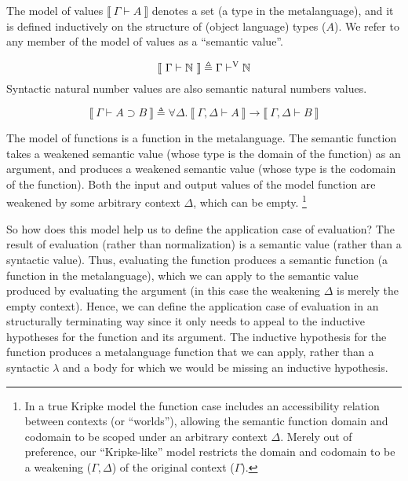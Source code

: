 \documentclass[runningheads,a4paper]{llncs}
\newenvironment{mydefinition}[3]
{ \begin{mydefinition'}[#1] \label{def:#2}
  \hfill\break
  #3
}
{ \end{mydefinition'} }
\def\dfn{\triangleq}
\def\arr{\supset}
\def\marr{\rightarrow}
\def\nat{\mathbb{N}}
\newcommand{\turn}[1]{\vdash^\con{#1}}
\newcommand{\all}[1]{\forall#1.~}
\newcommand{\els}[1]{\llbracket ~ #1 ~ \rrbracket}
\newcommand{\con}[1]{\textmd{#1}}
\newcommand{\typm}[1]{\els{\Gamma \vdash #1}}
\newcommand{\gdtypm}[1]{\els{\Gamma, \Delta \vdash #1}}
\newcommand{\typv}[1]{\Gamma \turn{V} #1}
\begin{document}
\begin{mydefinition}{Semantic Values}{mval}
{
The model of values $\typm{A}$ denotes a set (a type in the
metalanguage), and it is defined inductively on the structure
of (object language) types ($A$). We refer to any member of the model
of values as a ``semantic value''.
}

\begin{mycase}
$$
\typm{\nat} \dfn \typv{\nat}
$$
Syntactic natural number values are also semantic natural numbers
values.
\end{mycase}

\begin{mycase}[Functions]
$$
\typm{A \arr B} \dfn \all{\Delta} \gdtypm{A} \marr \gdtypm{B}
$$

The model of functions is a function in the metalanguage.
The semantic function takes a weakened semantic value (whose type is
the domain of the function) as an argument, and produces a
weakened semantic value (whose type is the codomain of the
function). Both the input and output values of the model function are
weakened by some arbitrary context $\Delta$, which can be empty.
\footnote{
In a true Kripke model the function case includes an accessibility relation
between contexts (or ``worlds''), allowing the semantic function domain and codomain to
be scoped under an arbitrary context $\Delta$. Merely out of preference, our
``Kripke-like'' model restricts the domain and codomain to be a
weakening ($\Gamma,\Delta$) of the original context ($\Gamma$).
}
\end{mycase}

\end{mydefinition}

So how does this model help us to define the application case of
evaluation? The result of evaluation (rather than
normalization) is a semantic value (rather than a syntactic value).
Thus, evaluating the function produces a semantic
function (a function in the metalanguage), which we can apply to the semantic value produced by evaluating
the argument (in this case the weakening $\Delta$ is merely the empty
context). Hence, we can define the application case of evaluation in
an structurally terminating way since it only needs to appeal to the
inductive hypotheses for the function and its argument. The inductive
hypothesis for the function produces a metalanguage function that we
can apply, rather than a syntactic $\lambda$ and a body for which we
would be missing an inductive hypothesis.
\end{document}
